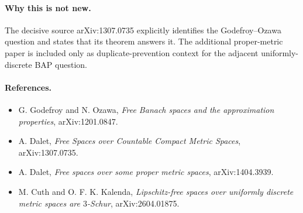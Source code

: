 \documentclass[11pt]{article}
\begin{document}
\paragraph{Why this is not new.}
The decisive source arXiv:1307.0735 explicitly identifies the Godefroy--Ozawa
question and states that its theorem answers it.  The additional proper-metric
paper is included only as duplicate-prevention context for the adjacent
uniformly-discrete BAP question.

\paragraph{References.}
\begin{itemize}
\item G. Godefroy and N. Ozawa, \emph{Free Banach spaces and the approximation properties}, arXiv:1201.0847.
\item A. Dalet, \emph{Free Spaces over Countable Compact Metric Spaces}, arXiv:1307.0735.
\item A. Dalet, \emph{Free spaces over some proper metric spaces}, arXiv:1404.3939.
\item M. Cuth and O. F. K. Kalenda, \emph{Lipschitz-free spaces over uniformly discrete metric spaces are \(3\)-Schur}, arXiv:2604.01875.
\end{itemize}
\end{document}
